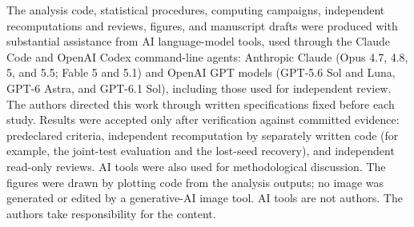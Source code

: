 \documentclass[11pt]{article}
\begin{document}
The analysis code, statistical procedures, computing campaigns, independent
recomputations and reviews, figures, and manuscript drafts were produced with
substantial assistance from AI language-model tools, used through the Claude
Code and OpenAI Codex command-line agents: Anthropic Claude (Opus 4.7, 4.8, 5,
and 5.5; Fable 5 and 5.1) and OpenAI GPT models (GPT-5.6 Sol and Luna,
GPT-6 Astra, and GPT-6.1 Sol), including those used for independent review. The
authors directed this work through written specifications fixed before each
study. Results were accepted only after verification against committed
evidence: predeclared criteria, independent recomputation by separately written
code (for example, the joint-test evaluation and the lost-seed recovery), and
independent read-only reviews. AI tools were also used for methodological
discussion. The figures were drawn by plotting code
from the analysis outputs; no image was generated or edited by a generative-AI
image tool. AI tools are not authors. The authors take responsibility for the
content.

\appendix




\printbibliography
\end{document}
